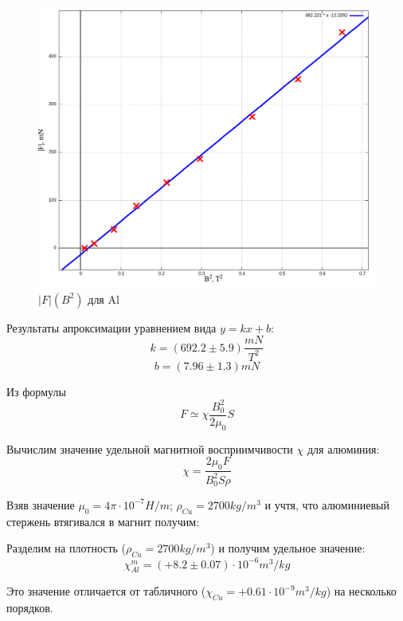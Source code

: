 \documentclass{article}
\begin{document}
    \begin{figure}[H]
        \centering
        \includegraphics[width=\textwidth]{Al-comp.png}
        \caption{$|F|(B^2)$ для Al}
    \end{figure}

    Результаты апроксимации уравнением вида \(y = kx + b\):
    \[ k = (692.2 \pm 5.9) \frac{mN}{T^2} \]
    \[ b = (7.96 \pm 1.3) mN \]

    Из формулы
    \[ F \simeq \chi\frac{B_0^2}{2\mu_0}S \]

    Вычислим значение удельной магнитной восприимчивости \(\chi\) для алюминия:
    \[ \chi = \frac{2\mu_0F}{B_0^2S\rho} \]

    Взяв значение \( \mu_0 = 4\pi \cdot 10^{-7} H/m \); \( \rho_{Cu} = 2700 kg/m^3 \) и учтя, что алюминиевый стержень
    втягивался в магнит получим:

    Разделим на плотность (\( \rho_{Cu} = 2700 kg/m^3 \)) и получим удельное значение:
    \[ \chi^{m}_{Al} = (+8.2 \pm 0.07) \cdot 10^{-6} m^3/kg \]

    Это значение отличается от табличного (\( \chi_{Cu} = +0.61 \cdot 10^{-9}m^3/kg  \)) на несколько порядков.
\end{document}
